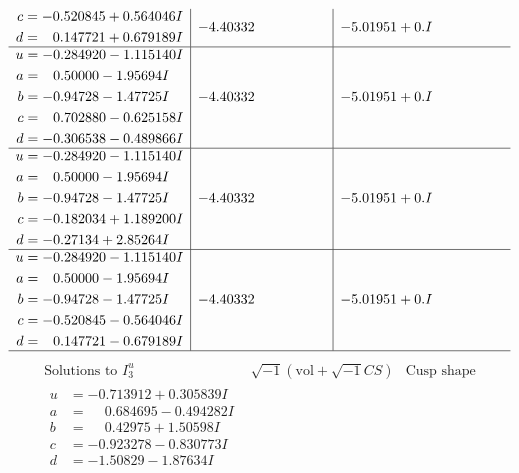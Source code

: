 \documentclass[1p]{elsarticle_modified}
\theoremstyle{definition}
\newcommand{\I}{\sqrt{-1}}
\begin{document}
$$\begin{array}{c|c|c}
\begin{aligned}
c &= -0.520845 + 0.564046 I \\
d &= \phantom{-}0.147721 + 0.679189 I\end{aligned}
 & -4.40332\phantom{ +0.000000I} & -5.01951 + 0. I\phantom{ +0.000000I} \\ \hline\begin{aligned}
u &= -0.284920 - 1.115140 I \\
a &= \phantom{-}0.50000 - 1.95694 I \\
b &= -0.94728 - 1.47725 I \\
c &= \phantom{-}0.702880 - 0.625158 I \\
d &= -0.306538 - 0.489866 I\end{aligned}
 & -4.40332\phantom{ +0.000000I} & -5.01951 + 0. I\phantom{ +0.000000I} \\ \hline\begin{aligned}
u &= -0.284920 - 1.115140 I \\
a &= \phantom{-}0.50000 - 1.95694 I \\
b &= -0.94728 - 1.47725 I \\
c &= -0.182034 + 1.189200 I \\
d &= -0.27134 + 2.85264 I\end{aligned}
 & -4.40332\phantom{ +0.000000I} & -5.01951 + 0. I\phantom{ +0.000000I} \\ \hline\begin{aligned}
u &= -0.284920 - 1.115140 I \\
a &= \phantom{-}0.50000 - 1.95694 I \\
b &= -0.94728 - 1.47725 I \\
c &= -0.520845 - 0.564046 I \\
d &= \phantom{-}0.147721 - 0.679189 I\end{aligned}
 & -4.40332\phantom{ +0.000000I} & -5.01951 + 0. I\phantom{ +0.000000I}\\
 \hline 
 \end{array}$$\newpage$$\begin{array}{c|c|c}  
\text{Solutions to }I^u_{3}& \I (\text{vol} + \sqrt{-1}CS) & \text{Cusp shape}\\
 \hline 
\begin{aligned}
u &= -0.713912 + 0.305839 I \\
a &= \phantom{-}0.684695 - 0.494282 I \\
b &= \phantom{-}0.42975 + 1.50598 I \\
c &= -0.923278 - 0.830773 I \\
d &= -1.50829 - 1.87634 I\end{aligned}

\end{array}$$
\end{document}
